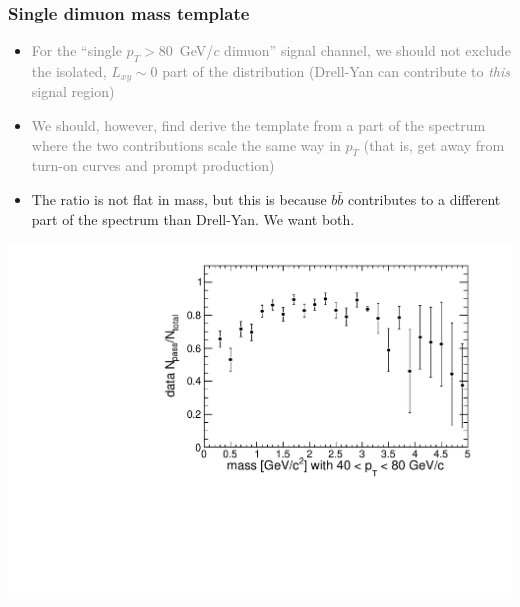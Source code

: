 \documentclass[compress]{beamer}
\begin{document}
\begin{frame}
\frametitle{Single dimuon mass template}

\begin{itemize}
\item \textcolor{gray}{For the ``single $p_T > 80$~GeV/$c$ dimuon'' signal channel, we
  should not exclude the isolated, $L_{xy} \sim 0$ part of the distribution
  (Drell-Yan can contribute to {\it this} signal region)}
\item \textcolor{gray}{We should, however, find derive the template from a part of the
  spectrum where the two contributions scale the same way in $p_T$
  (that is, get away from turn-on curves and prompt production)}
\item The ratio is not flat in mass, but this is because $b\bar{b}$
  contributes to a different part of the spectrum than Drell-Yan.  We
  want both.
\end{itemize}

\begin{center}
\includegraphics[width=0.5\linewidth]{lowdimuon_40-80_massratio.pdf}
\end{center}
\end{frame}
\end{document}
